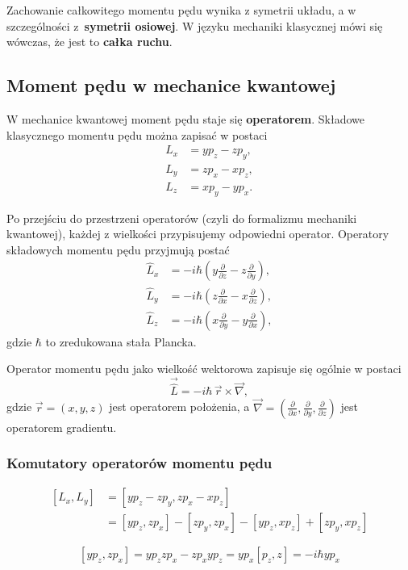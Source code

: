 Zachowanie całkowitego momentu pędu wynika z symetrii układu, a w szczególności z~\textbf{symetrii osiowej}. W języku mechaniki klasycznej mówi się wówczas, że jest to \textbf{całka ruchu}.

\subsection{Moment pędu w mechanice kwantowej}
W mechanice kwantowej moment pędu staje się \textbf{operatorem}. Składowe klasycznego momentu pędu można zapisać w postaci
$$
\begin{aligned}
L_x &= y p_z - z p_y, \\
L_y &= z p_x - x p_z, \\
L_z &= x p_y - y p_x.
\end{aligned}
$$

Po przejściu do przestrzeni operatorów (czyli do formalizmu mechaniki kwantowej), każdej z wielkości przypisujemy odpowiedni operator. Operatory składowych momentu pędu przyjmują postać
$$
\begin{aligned}
\hat{L}_x &= -i\hbar \left( y \frac{\partial}{\partial z} - z \frac{\partial}{\partial y} \right), \\
\hat{L}_y &= -i\hbar \left( z \frac{\partial}{\partial x} - x \frac{\partial}{\partial z} \right), \\
\hat{L}_z &= -i\hbar \left( x \frac{\partial}{\partial y} - y \frac{\partial}{\partial x} \right),
\end{aligned}
$$
gdzie $\hbar$ to zredukowana stała Plancka.

Operator momentu pędu jako wielkość wektorowa zapisuje się ogólnie w postaci
$$
\vec{\hat{L}} = -i\hbar\, \vec{r} \times \vec{\nabla},
$$
gdzie $\vec{r} = (x, y, z)$ jest operatorem położenia, a $\vec{\nabla} = \left( \frac{\partial}{\partial x}, \frac{\partial}{\partial y}, \frac{\partial}{\partial z} \right)$ jest operatorem gradientu.

\subsubsection*{Komutatory operatorów momentu pędu}
$$
\begin{aligned}
[L_x, L_y] &= [y p_z - z p_y, z p_x - x p_z] \\
&= [y p_z, z p_x] - [z p_y, z p_x] - [y p_z, x p_z] + [z p_y, x p_z]
\end{aligned}
$$

$$
[yp_z, zp_x] = yp_z zp_x - zp_x yp_z = y p_x [p_z, z] = -i\hbar y p_x
$$

